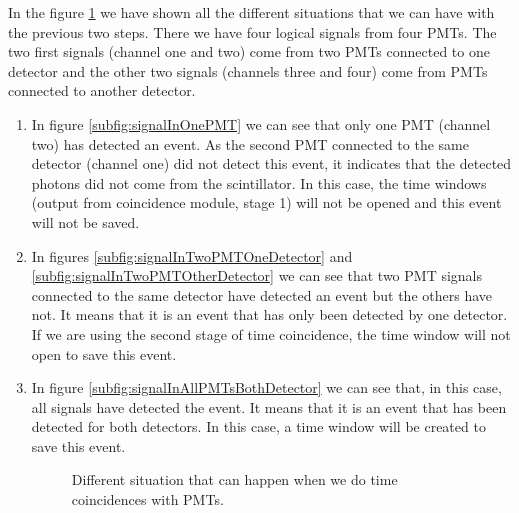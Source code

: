 \begin{itemize}
\begin{enumerate}
In the figure \ref{fig:DifferentCoincidences} we have shown all the different situations that we can have with the previous two steps. There we have four logical signals from four PMTs. The two first signals (channel one and two) come from two PMTs connected to one detector and the other two signals (channels three and four) come from PMTs connected to another detector.

\begin{enumerate}
\item{} In figure \ref{subfig:signalInOnePMT} we can see that only one PMT (channel two) has detected an event. As the second PMT connected to the same detector (channel one) did not detect this event, it indicates that the detected photons did not come from the scintillator. In this case, the time windows (output from coincidence module, stage 1) will not be opened and this event will not be saved.

\item{} In figures \ref{subfig:signalInTwoPMTOneDetector} and \ref{subfig:signalInTwoPMTOtherDetector} we can see that two PMT signals connected to the same detector have detected an event but the others have not. It means that it is an event that has only been detected by one detector. If we are using the second stage of time coincidence, the time window will not open to save this event.

\item{} In figure \ref{subfig:signalInAllPMTsBothDetector} we can see that, in this case, all signals have detected the event. It means that it is an event that has been detected for both detectors. In this case, a time window will be created to save this event.

\begin{figure}[htbp]
 \centering
   \newline
 \caption{Different situation that can happen when we do time coincidences with PMTs.}
 \label{fig:DifferentCoincidences}
\end{figure}



\end{enumerate}
\end{enumerate}
\end{itemize}
